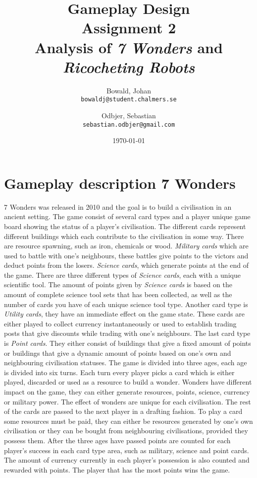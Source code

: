 \documentclass[a4paper]{article}
\title{Gameplay Design \\ Assignment 2 \\ Analysis of \textit{7 Wonders} and \textit{Ricocheting Robots} }
\author{
  Bowald, Johan\\
  \texttt{bowaldj@student.chalmers.se}
  \and
  Odbjer, Sebastian\\
  \texttt{sebastian.odbjer@gmail.com}
}
\date{\today}
\begin{document}
\maketitle
\newpage
\tableofcontents{}
\newpage

\section{Gameplay description 7 Wonders}
\label{sec:what7wond}
7 Wonders was released in 2010 and the goal is to build a civilisation in an ancient setting.
The game consist of several card types and a player unique game board showing the status of a player's civilisation.
The different cards represent different buildings which each contribute to the civilisation in some way.
There are resource spawning, such as iron, chemicals or wood. \textit{Military cards} which are used to battle with one's neighbours, these battles give points to the victors and deduct points from the losers.
\textit{Science cards}, which generate points at the end of the game. There are three different types of \textit{Science cards}, each with a unique scientific tool.
The amount of points given by \textit{Science cards} is based on the amount of complete science tool sets that has been collected, as well as the number of cards you have of each unique science tool type.
Another card type is \textit{Utility cards}, they have an immediate effect on the game state.
These cards are either played to collect currency instantaneously or used to establish trading posts that give discounts while trading with one's neighbours.
The last card type is \textit{Point cards}.
They either consist of buildings that give a fixed amount of points or buildings that give a dynamic amount of points based on one's own and neighbouring civilisation statuses.
The game is divided into three ages, each age is divided into six turns.
Each turn every player picks a card which is either played, discarded or used as a resource to build a wonder.
Wonders have different impact on the game, they can either generate resources, points, science, currency or military power.
The effect of wonders are unique for each civilisation.
The rest of the cards are passed to the next player in a drafting fashion.
To play a card some resources must be paid, they can either be resources generated by one's own civilisation or they can be bought from neighbouring civilisations, provided they possess them.
After the three ages have passed points are counted for each player's success in each card type area, such as military, science and point cards.
The amount of currency currently in each player's possession is also counted and rewarded with points.
The player that has the most points wins the game.
\end{document}
